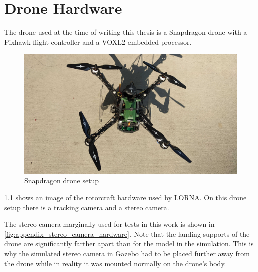 \chapter{Drone Hardware}
\label{ch:drone}

The drone used at the time of writing this thesis is a Snapdragon drone with a Pixhawk flight controller and a VOXL2 embedded processor.

\begin{figure}[h]
\centering
\includegraphics[scale=0.5]{images/appendix/Drone/drone.jpg}
\caption{Snapdragon drone setup}
\label{fig:appendix_drone_hardware}
\end{figure}

\cref{fig:appendix_drone_hardware} shows an image of the rotorcraft hardware used by LORNA. On this drone setup there is a tracking camera and a stereo camera.

The stereo camera marginally used for tests in this work is shown in \cref{fig:appendix_stereo_camera_hardware}. Note that the landing supports of the drone are significantly farther apart than for the model in the simulation. This is why the simulated stereo camera in Gazebo had to be placed further away from the drone while in reality it was mounted normally on the drone's body.

